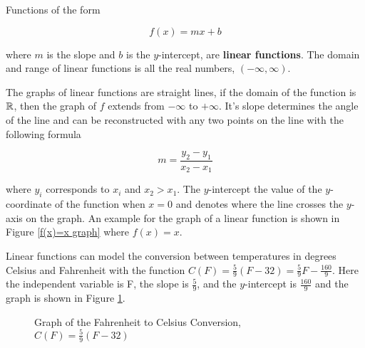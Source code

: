 \begin{definition}
    Functions of the form

    \begin{equation}
        f(x) = mx + b
    \end{equation}

    \noindent where $m$ is the slope and $b$ is the $y$-intercept, are \textbf{linear functions}. The domain and range of linear functions is all the real numbers, $(-\infty,\infty)$.
\end{definition}

The graphs of linear functions are straight lines, if the domain of the function is $\mathbb{R}$, then the graph of $f$ extends from $-\infty$ to $+\infty$. It's slope determines the angle of the line and can be reconstructed with any two points on the line with the following formula

\begin{equation}
    m = \frac{y_2-y_1}{x_2-x_1}
    \label{slopeofaline}
\end{equation}

\noindent where $y_i$ corresponds to $x_i$ and $x_2 > x_1$. The $y$-intercept the value of the $y$-coordinate of the function when $x=0$ and denotes where the line crosses the $y$-axis on the graph. An example for the graph of a linear function is shown in Figure \ref{f(x)=x graph} where $f(x) = x$.

\begin{example}
    Linear functions can model the conversion between temperatures in degrees Celsius and Fahrenheit with the function $C(F) = \frac{5}{9}(F - 32) = \frac{5}{9}F - \frac{160}{9}$. Here the independent variable is F, the slope is $\frac{5}{9}$, and the $y$-intercept is $\frac{160}{9}$ and the graph is shown in Figure \ref{FtoCgraph}.

    \begin{figure}[!ht]
        \centering
        \label{FtoCgraph}
        \caption{Graph of the Fahrenheit to Celsius Conversion, $C(F) = \frac{5}{9}(F-32)$}
    \end{figure}
\end{example}

